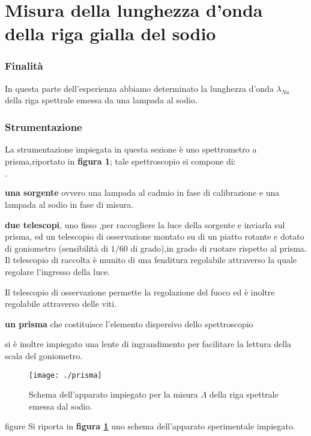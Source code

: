 \newpage
\part{Misura della lunghezza d'onda della riga gialla del sodio}
\section{Finalità}
	In questa parte dell'esperienza abbiamo determinato la lunghezza d’onda $\lambda_{Na}$ della riga spettrale
	emessa da una lampada al sodio.
\section{Strumentazione}\label{sez:str_a}
	La strumentazione impiegata in questa sezione è uno spettrometro a 
	prisma,riportato in \textbf{figura 1};
	tale spettroscopio si compone di:
	\begin{list}{$\cdot$}{}
		\item \textbf{una sorgente } ovvero una lampada al cadmio in fase
		di
		calibrazione e una lampada al sodio in fase di misura.
		\item \textbf{due telescopi}, uno fisso	,per raccogliere la luce 
		della 
		sorgente e inviarla sul prisma, ed un telescopio di osservazione
		montato su di un piatto rotante e dotato di goniometro 
		(sensibilità di $1/60$ di grado),in grado di ruotare 
		rispetto al prisma.
		Il telescopio di raccolta  è munito di una fenditura regolabile
		attraverso la quale regolare l'ingresso della luce.
	
		Il telescopio di osservazione permette la regolazione del fuoco 
		ed è 
		inoltre regolabile attraverso delle viti.
		\item \textbf{un prisma} che costituisce l'elemento dispersivo 
		dello
		spettroscopio 
	\end{list}
	\bigskip
	si è inoltre impiegato una lente di ingrandimento per facilitare la 
	lettura della scala del goniometro.

	\bigskip


	\begin{figure} [!h]
		\centering
		\texttt{[image: ./prisma]}
		\caption{Schema dell'apparato impiegato per la misura $\Lambda$ 
		della riga 
		spettrale emessa dal sodio.}
		\label{fig:prisma}
	\end{figure}{figure}
	Si riporta in \textbf{figura \ref{fig:prisma} }uno schema 
	dell'apparato
	sperimentale impiegato. 